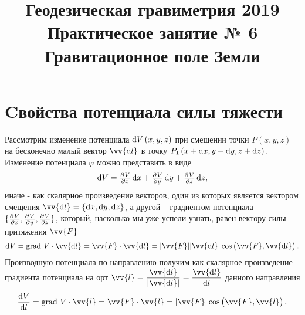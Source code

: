 \documentclass[11pt, a4paper]{article}
\title{{\Large Геодезическая гравиметрия 2019}\\ 
    {\bf\Large Практическое занятие № 6} \\
{\Large Гравитационное поле Земли}}
\author{}
\date{\DTMusedate{lessondate}}
\theoremstyle{plain}
\theoremstyle{definition}
\theoremstyle{remark}
\renewcommand{\phi}{\ensuremath{\varphi}}
\begin{document}
\maketitle
\section{Cвойства потенциала силы тяжести}
Рассмотрим изменение потенциала $\dif V \left(x, y, z\right)$ при смещении точки $P\left( x, y,z \right)$ на бесконечно малый вектор $\vv{\dif l}$ в точку $P_1\left( x + \dif x, y + \dif y, z + \dif z \right)$.
Изменение потенциала $\phi$ можно представить в виде
\begin{equation*}
    \dif V = \pd{V}{x}\dif x + \pd{V}{y}\dif y + \pd{V}{z}\dif z, 
\end{equation*}
иначе - как скалярное произведение векторов, один из которых является вектором смещения $\vv{\dif l} = \{\dif x, \dif y, \dif z\}$, а другой – градиентом потенциала $\{\pd{V}{x}, \pd{V}{y}, \pd{V}{z}\}$, который, насколько мы уже успели узнать, равен вектору силы притяжения $\vv{F}$
\begin{equation*}
    \dif V = \text{grad } V \cdot \vv{\dif l} = \vv{F} \cdot \vv{\dif l} = |\vv{F}| |\vv{\dif l}| \cos \left(\vv{F}, \vv{\dif l}\right).
\end{equation*}
Производную потенциала по направлению получим как скалярное произведение градиента потенциала на орт $\vv{l} = \dfrac{\vv{\dif l}}{|\vv{\dif l}|} = \dfrac{\vv{\dif l}}{\dif l}$ данного направления 
\begin{equation}
    \dfrac{\dif V}{\dif l} = \text{grad } V \cdot \vv{l} = \vv{F} \cdot \vv{l} = | \vv{F}| \cos \left(\vv{F}, \vv{l}\right).
\end{equation}
\end{document}
